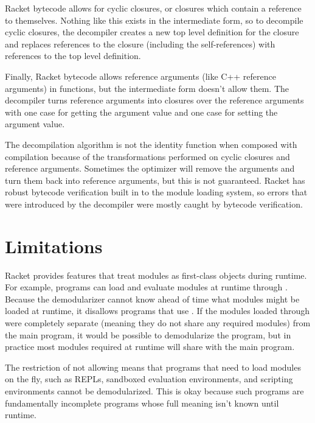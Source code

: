 Racket bytecode allows for cyclic closures, or closures which contain a reference to themselves.
Nothing like this exists in the intermediate form, so to decompile cyclic closures, the decompiler creates a new top level definition for the closure and replaces references to the closure (including the self-references) with references to the top level definition.

Finally, Racket bytecode allows reference arguments (like C++ reference arguments) in functions, but the intermediate form doesn't allow them.
The decompiler turns reference arguments into  closures over the reference arguments with one case for getting the argument value and one case for setting the argument value. 

The decompilation algorithm is not the identity function when composed with compilation because of the transformations performed on cyclic closures and reference arguments.
Sometimes the optimizer will remove the  arguments and turn them back into reference arguments, but this is not guaranteed. 
Racket has robust bytecode verification built in to the module loading system, so errors that were introduced by the decompiler were mostly caught by bytecode verification.

\section{Limitations}

Racket provides features that treat modules as first-class objects during runtime. 
For example, programs can load and evaluate modules at runtime through . 
Because the demodularizer cannot know ahead of time what modules might be loaded at runtime, it disallows programs that use .
If the modules loaded through  were completely separate (meaning they do not share any required modules) from the main program, it would be possible to demodularize the program, but in practice most modules required at runtime will share with the main program.

The restriction of not allowing  means that programs that need to load modules on the fly, such as REPLs, sandboxed evaluation environments, and scripting environments cannot be demodularized.
This is okay because such programs are fundamentally incomplete programs whose full meaning isn't known until runtime.

